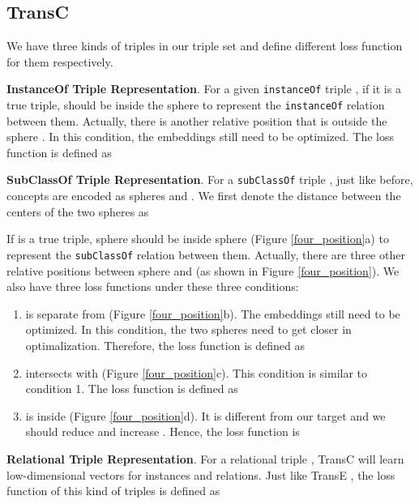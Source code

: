 \documentclass[11pt,a4paper]{article}
\begin{document}
  \subsection{TransC}
  
  We have three kinds of triples in our triple set  and define different loss function for them respectively.
  


  \textbf{InstanceOf Triple Representation}. For a given \texttt{instanceOf} triple , 
   if it is a true triple,  should be inside the sphere  to represent
  the \texttt{instanceOf} relation between them. 
  Actually, there is another relative position that  is outside the sphere . In this condition, 
  the embeddings still need to be optimized. The loss function is defined as
  
  
  \textbf{SubClassOf Triple Representation}. For a \texttt{subClassOf} triple , just like before, 
  concepts  are encoded as spheres  and . 
  We first denote the distance between the centers of the two spheres as
  
  If  is a true triple, sphere  should be inside sphere  (Figure \ref{four_position}a) to represent the \texttt{subClassOf} relation between them.
  Actually, there are three other relative positions between sphere  and  (as shown in Figure \ref{four_position}). We also have three loss functions under these 
  three conditions:
  \begin{enumerate}
    \item  is separate from  (Figure \ref{four_position}b). The embeddings still need to be optimized. In this condition, 
    the two spheres need to get closer in optimalization.
    Therefore, the loss function is defined as
    
    \item  intersects with  (Figure \ref{four_position}c). This condition is similar to condition 1. The loss function is defined as
    
    \item  is inside  (Figure \ref{four_position}d). It is different from our target and we should reduce  and increase . Hence, the loss function is
    
  \end{enumerate}
  
  \textbf{Relational Triple Representation}. For a relational triple , TransC will learn low-dimensional 
  vectors  for instances and relations. Just like TransE \cite{TransE},
  the loss function of this kind of triples is defined as
  
\end{document}
